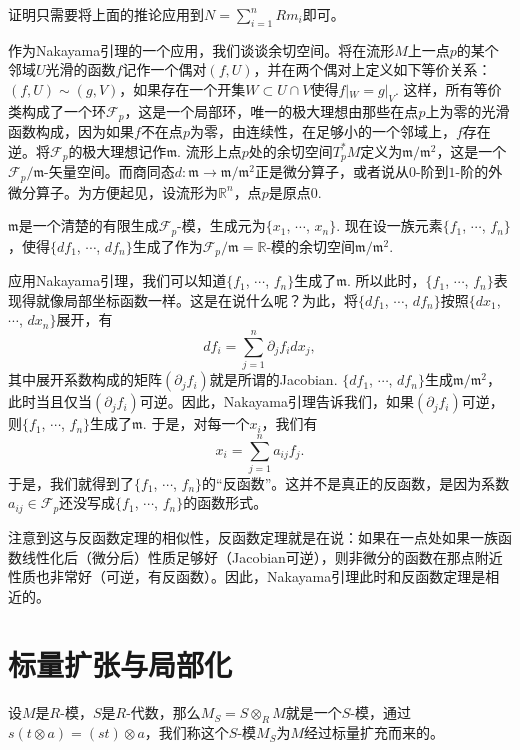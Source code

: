 证明只需要将上面的推论应用到$N=\sum_{i=1}^n Rm_i$即可。

\para 作为Nakayama引理的一个应用，我们谈谈余切空间。将在流形$M$上一点$p$的某个邻域$U$光滑的函数$f$记作一个偶对$(f,U)$，并在两个偶对上定义如下等价关系：$(f,U)\sim (g,V)$，如果存在一个开集$W\subset U\cap V$使得$f|_W=g|_V$. 这样，所有等价类构成了一个环$\mathcal{F}_p$，这是一个局部环，唯一的极大理想由那些在点$p$上为零的光滑函数构成，因为如果$f$不在点$p$为零，由连续性，在足够小的一个邻域上，$f$存在逆。将$\mathcal{F}_p$的极大理想记作$\mathfrak{m}$. 流形上点$p$处的余切空间$T_p^*M$定义为$\mathfrak{m}/\mathfrak{m}^2$，这是一个$\mathcal{F}_p/\mathfrak{m}$-矢量空间。而商同态$d:\mathfrak{m}\to \mathfrak{m}/\mathfrak{m}^2$正是微分算子，或者说从$0$-阶到$1$-阶的外微分算子。为方便起见，设流形为$\mathbb{R}^n$，点$p$是原点$0$.

$\mathfrak{m}$是一个清楚的有限生成$\mathcal{F}_p$-模，生成元为$\{x_1$, $\cdots$, $x_n\}$. 现在设一族元素$\{f_1$, $\cdots$, $f_n\}$，使得$\{df_1$, $\cdots$, $df_n\}$生成了作为$\mathcal{F}_p/\mathfrak{m}=\mathbb{R}$-模的余切空间$\mathfrak{m}/\mathfrak{m}^2$.

应用Nakayama引理，我们可以知道$\{f_1$, $\cdots$, $f_n\}$生成了$\mathfrak{m}$. 所以此时，$\{f_1$, $\cdots$, $f_n\}$表现得就像局部坐标函数一样。这是在说什么呢？为此，将$\{df_1$, $\cdots$, $df_n\}$按照$\{dx_1$, $\cdots$, $dx_n\}$展开，有
\[
	df_i=\sum_{j=1}^n\partial_jf_i dx_j,
\]
其中展开系数构成的矩阵$(\partial_jf_i)$就是所谓的Jacobian. $\{df_1$, $\cdots$, $df_n\}$生成$\mathfrak{m}/\mathfrak{m}^2$，此时当且仅当$(\partial_jf_i)$可逆。因此，Nakayama引理告诉我们，如果$(\partial_jf_i)$可逆，则$\{f_1$, $\cdots$, $f_n\}$生成了$\mathfrak{m}$. 于是，对每一个$x_i$，我们有
\[
	x_i=\sum_{j=1}^n a_{ij}f_j.
\]
于是，我们就得到了$\{f_1$, $\cdots$, $f_n\}$的“反函数”。这并不是真正的反函数，是因为系数$a_{ij}\in \mathcal{F}_p$还没写成$\{f_1$, $\cdots$, $f_n\}$的函数形式。

注意到这与反函数定理的相似性，反函数定理就是在说：如果在一点处如果一族函数线性化后（微分后）性质足够好（Jacobian可逆），则非微分的函数在那点附近性质也非常好（可逆，有反函数）。因此，Nakayama引理此时和反函数定理是相近的。

\section{标量扩张与局部化}

\para 设$M$是$R$-模，$S$是$R$-代数，那么$M_S=S\otimes_R M$就是一个$S$-模，通过$s(t\otimes a)=(st)\otimes a$，我们称这个$S$-模$M_S$为$M$经过标量扩充而来的。

